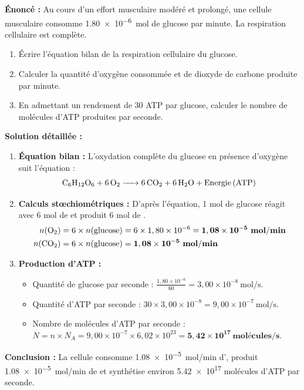 \documentclass[11pt]{article}
\begin{document}
\begin{exoresolu}
    \textbf{Énoncé :} Au cours d'un effort musculaire modéré et prolongé, une cellule musculaire consomme \SI{1,80e-6}{mol} de glucose par minute. La respiration cellulaire est complète.
    \begin{enumerate}
        \item Écrire l'équation bilan de la respiration cellulaire du glucose.
        \item Calculer la quantité d'oxygène consommée et de dioxyde de carbone produite par minute.
        \item En admettant un rendement de \num{30} ATP par glucose, calculer le nombre de molécules d'ATP produites par seconde.
    \end{enumerate}
    \tcblower
    \textbf{Solution détaillée :}
    \begin{enumerate}
        \item \textbf{Équation bilan :} L'oxydation complète du glucose en présence d'oxygène suit l'équation :
              \[ \ce{C6H12O6 + 6 O2 -> 6 CO2 + 6 H2O + Energie (ATP)} \]
        \item \textbf{Calculs stœchiométriques :} D'après l'équation, 1 mol de glucose réagit avec 6 mol de  et produit 6 mol de .
              \begin{align*}
                  n(\ce{O2}) &= 6 \times n(\text{glucose}) = 6 \times 1,80 \times 10^{-6} = \mathbf{1,08 \times 10^{-5}\ mol/min} \\
                  n(\ce{CO2}) &= 6 \times n(\text{glucose}) = \mathbf{1,08 \times 10^{-5}\ mol/min}
              \end{align*}
        \item \textbf{Production d'ATP :}
              \begin{itemize}
                  \item Quantité de glucose par seconde : $\frac{1,80 \times 10^{-6}}{60} = 3,00 \times 10^{-8}\ \text{mol/s}$.
                  \item Quantité d'ATP par seconde : $30 \times 3,00 \times 10^{-8} = 9,00 \times 10^{-7}\ \text{mol/s}$.
                  \item Nombre de molécules d'ATP par seconde : $N = n \times N_A = 9,00 \times 10^{-7} \times 6,02 \times 10^{23} = \mathbf{5,42 \times 10^{17}\ \text{molécules/s}}$.
              \end{itemize}
    \end{enumerate}
    \textbf{Conclusion :} La cellule consomme \SI{1,08e-5}{mol/min} d', produit \SI{1,08e-5}{mol/min} de  et synthétise environ \num{5,42e17} molécules d'ATP par seconde.
\end{exoresolu}
\end{document}
